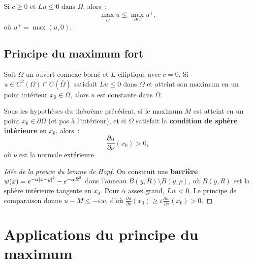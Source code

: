 \begin{theoreme}
Si $c \geq 0$ et $Lu \leq 0$ dans $\Omega$, alors~:
\begin{equation}\label{eq:max_faible_c}
    \max_{\overline{\Omega}} u \leq \max_{\partial\Omega} u^+,
\end{equation}
o\`u $u^+ = \max(u, 0)$.
\end{theoreme}

\subsection{Principe du maximum fort}

\begin{theoreme}
\label{thm:max_fort}
Soit $\Omega$ un ouvert connexe born\'e et $L$ elliptique avec $c = 0$.
Si $u \in C^2(\Omega) \cap C(\overline{\Omega})$ satisfait $Lu \leq 0$
dans $\Omega$ et atteint son maximum en un point int\'erieur $x_0 \in \Omega$,
alors $u$ est constante dans $\Omega$.
\end{theoreme}

\begin{theoreme}
\label{thm:hopf_lemma}
Sous les hypoth\`eses du th\'eor\`eme pr\'ec\'edent, si le maximum $M$ est
atteint en un point $x_0 \in \partial\Omega$ (et pas \`a l'int\'erieur),
et si $\Omega$ satisfait la \textbf{condition de sph\`ere int\'erieure}
en $x_0$, alors~:
\begin{equation}\label{eq:hopf_lemma}
    \frac{\partial u}{\partial \nu}(x_0) > 0,
\end{equation}
o\`u $\nu$ est la normale ext\'erieure.
\end{theoreme}

\begin{proof}[Id\'ee de la preuve du lemme de Hopf]
On construit une \textbf{barri\`ere} $w(x) = e^{-\alpha\left| x-y \right|^2} - e^{-\alpha R^2}$
dans l'anneau $B(y,R) \setminus B(y,\rho)$, o\`u $B(y,R)$ est la sph\`ere
int\'erieure tangente en $x_0$. Pour $\alpha$ assez grand, $Lw < 0$.
Le principe de comparaison donne $u - M \leq -\varepsilon w$,
d'o\`u $\frac{\partial u}{\partial \nu}(x_0) \geq \varepsilon \frac{\partial w}{\partial \nu}(x_0) > 0$.
\end{proof}

\section{Applications du principe du maximum}

